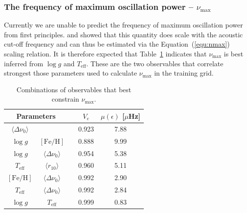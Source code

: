 \subsubsection*{The frequency of maximum oscillation power -- $\nu_{\max}$} 


Currently we are unable to predict the frequency of maximum oscillation power from first principles. \citet{1991ApJ...368..599B} and \citet{1995A&A...293...87K} showed that this quantity does scale with the acoustic cut-off frequency and can thus be estimated via the Equation~(\ref{equ:nmax}) scaling relation. It is therefore expected that Table~\ref{tab:nmx} indicates that  $\nu_{\max}$ is best inferred from ${\log{} g}$  and $T_{\text{eff}}$. These are the two observables that correlate strongest those parameters used to calculate $\nu_{\max}$ in the training grid. 

\begin{table}
\centering
\caption{Combinations of observables that  best constrain $\nu_{\max}$.}
    \begin{tabular}{ccccc}
\hline    \hline
\multicolumn{2}{c}{Parameters} && $V_e$ &$\mu (\epsilon)$ [$\mu$Hz] \\ \hline 
$\langle\Delta\nu_0\rangle$ &&&0.923  & 7.88 \\
$\log{} g$ & $[\text{Fe/H}]$ && 0.888 & 9.99 \\
$\log{} g$     & $\langle\Delta\nu_0\rangle$     &&0.954  & 5.38\\
$T_{\text{eff}}$     & $\langle r_{10}\rangle$ &   &0.960  & 5.11\\
$[\text{Fe/H}]$    &$\langle\Delta\nu_0\rangle$        &       &0.992  & 2.90\\
$T_{\text{eff}}$     & $\langle\Delta\nu_0\rangle$    &  &0.992  & 2.84\\
$\log{} g$  & $T_{\text{eff}}$                 &&0.999  & 0.83\\
\hline
    \end{tabular}
    \label{tab:nmx}
\end{table}


